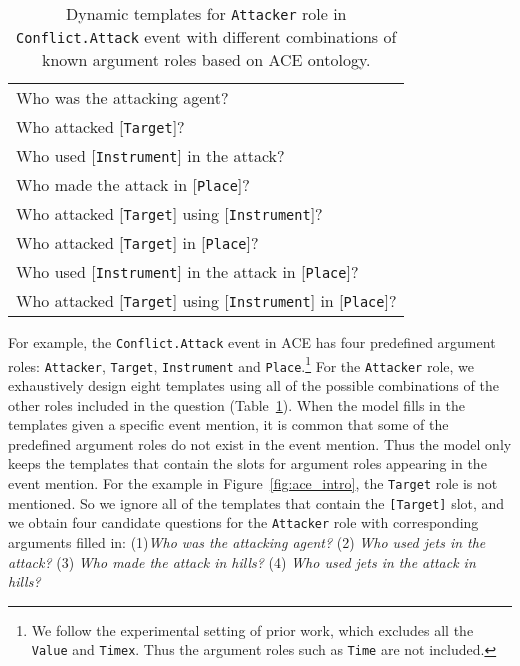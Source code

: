 \begin{table}[th]
    \centering
    \small
    \begin{tabular}{l}
    \hline
        Who was the attacking agent? \\
        Who attacked [\texttt{Target}]?\\
        Who used [\texttt{Instrument}] in the attack?\\
        Who made the attack in [\texttt{Place}]?\\
        Who attacked [\texttt{Target}] using [\texttt{Instrument}]?\\
        Who attacked [\texttt{Target}] in [\texttt{Place}]?\\
        Who used [\texttt{Instrument}] in the attack in [\texttt{Place}]?\\
        Who attacked [\texttt{Target}] using [\texttt{Instrument}] in [\texttt{Place}]? \\ 
        \hline
    \end{tabular}
    \caption{Dynamic templates for \texttt{Attacker} role in \texttt{Conflict.Attack} event with different combinations of known argument roles based on ACE ontology.}
    \label{tab:templates}
\end{table}

For example, the \texttt{Conflict.Attack} event in ACE has four predefined argument roles: \texttt{Attacker}, \texttt{Target}, \texttt{Instrument} and \texttt{Place}.\footnote{We follow the experimental setting of prior work, which excludes all the \texttt{Value} and \texttt{Timex}. Thus the argument roles such as \texttt{Time} are not included.}
For the \texttt{Attacker} role, we exhaustively design eight templates using all of the possible combinations of the other roles included in the question (Table~\ref{tab:templates}). 
When the model fills in the templates given a specific event mention, it is common that some of the predefined argument roles do not exist in the event mention. Thus the model only keeps the templates that contain the slots for argument roles appearing in the event mention.
For the example in Figure~\ref{fig:ace_intro}, the \texttt{Target} role is not mentioned. So we ignore all of the templates that contain the \texttt{[Target]} slot, and we obtain four candidate questions for the \texttt{Attacker} role with corresponding arguments filled in: (1)\textit{Who was the attacking agent?} (2) \textit{Who used jets in the attack?} (3) \textit{Who made the attack in hills?} (4) \textit{Who used jets in the attack in hills?}

